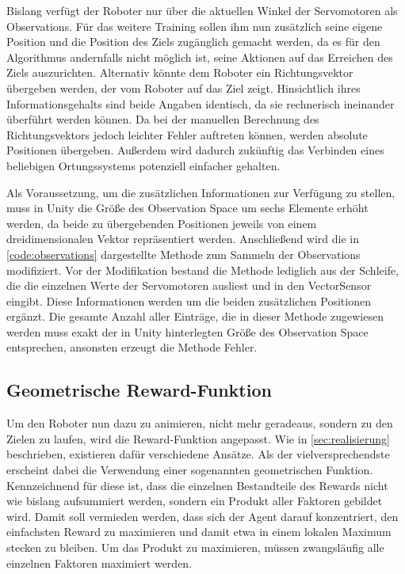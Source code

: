 Bislang verfügt der Roboter nur über die aktuellen Winkel der Servomotoren als Observations.
Für das weitere Training sollen ihm nun zusätzlich seine eigene Position und die Position des Ziels zugänglich gemacht werden, da es für den Algorithmus andernfalls nicht möglich ist, seine Aktionen auf das Erreichen des Ziels auszurichten.
Alternativ könnte dem Roboter ein Richtungsvektor übergeben werden, der vom Roboter auf das Ziel zeigt.
Hinsichtlich ihres Informationsgehalts sind beide Angaben identisch, da sie rechnerisch ineinander überführt werden können.
Da bei der manuellen Berechnung des Richtungsvektors jedoch leichter Fehler auftreten können, werden absolute Positionen übergeben.
Außerdem wird dadurch zukünftig das Verbinden eines beliebigen Ortungssystems potenziell einfacher gehalten.

Als Voraussetzung, um die zusätzlichen Informationen zur Verfügung zu stellen, muss in Unity die Größe des Observation Space um sechs Elemente erhöht werden, da beide zu übergebenden Positionen jeweils von einem dreidimensionalen Vektor repräsentiert werden.
Anschließend wird die in \autoref{code:observations} dargestellte Methode zum Sammeln der Observations modifiziert.
Vor der Modifikation bestand die Methode lediglich aus der Schleife, die die einzelnen Werte der Servomotoren ausliest und in den VectorSensor eingibt.
Diese Informationen werden um die beiden zusätzlichen Positionen ergänzt.
Die gesamte Anzahl aller Einträge, die in dieser Methode zugewiesen werden muss exakt der in Unity hinterlegten Größe des Observation Space entsprechen, ansonsten erzeugt die Methode Fehler.

\begin{figure}
    
\end{figure}

\subsection{Geometrische Reward-Funktion}
Um den Roboter nun dazu zu animieren, nicht mehr geradeaus, sondern zu den Zielen zu laufen, wird die Reward-Funktion angepasst.
Wie in \autoref{sec:realisierung} beschrieben, existieren dafür verschiedene Ansätze.
Als der vielversprechendste erscheint dabei die Verwendung einer sogenannten geometrischen Funktion.
Kennzeichnend für diese ist, dass die einzelnen Bestandteile des Rewards nicht wie bislang aufsummiert werden, sondern ein Produkt aller Faktoren gebildet wird.
Damit soll vermieden werden, dass sich der Agent darauf konzentriert, den einfachsten Reward zu maximieren und damit etwa in einem lokalen Maximum stecken zu bleiben.
Um das Produkt zu maximieren, müssen zwangsläufig alle einzelnen Faktoren maximiert werden.

